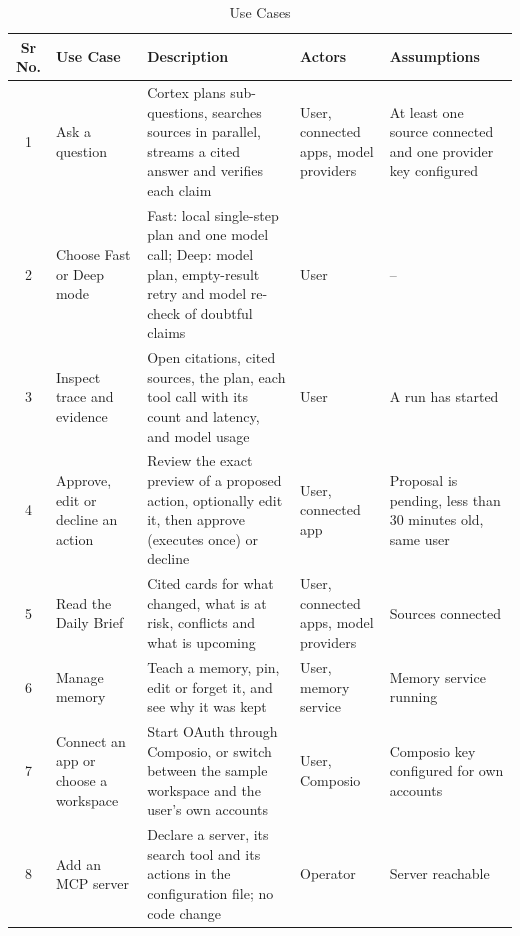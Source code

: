 \documentclass[oneside,a4paper,12pt]{report}
\begin{document}
\begin{table}[!htbp]
\begin{center}
\def\arraystretch{1.3}
\small
\begin{tabularx}{\textwidth}{| c | p{2.6cm} | X | p{2.3cm} | X |}
\hline
Sr No.	& Use Case	& Description	& Actors	& Assumptions \\
\hline
1& Ask a question & Cortex plans sub-questions, searches sources in parallel, streams a cited answer and verifies each claim & User, connected apps, model providers & At least one source connected and one provider key configured \\
\hline
2& Choose Fast or Deep mode & Fast: local single-step plan and one model call; Deep: model plan, empty-result retry and model re-check of doubtful claims & User & -- \\
\hline
3& Inspect trace and evidence & Open citations, cited sources, the plan, each tool call with its count and latency, and model usage & User & A run has started \\
\hline
4& Approve, edit or decline an action & Review the exact preview of a proposed action, optionally edit it, then approve (executes once) or decline & User, connected app & Proposal is pending, less than 30 minutes old, same user \\
\hline
5& Read the Daily Brief & Cited cards for what changed, what is at risk, conflicts and what is upcoming & User, connected apps, model providers & Sources connected \\
\hline
6& Manage memory & Teach a memory, pin, edit or forget it, and see why it was kept & User, memory service & Memory service running \\
\hline
7& Connect an app or choose a workspace & Start OAuth through Composio, or switch between the sample workspace and the user's own accounts & User, Composio & Composio key configured for own accounts \\
\hline
8& Add an MCP server & Declare a server, its search tool and its actions in the configuration file; no code change & Operator & Server reachable \\
\hline
\end{tabularx}
\end{center}
\caption{Use Cases}
\label{tab:usecase}
\end{table}
\end{document}

